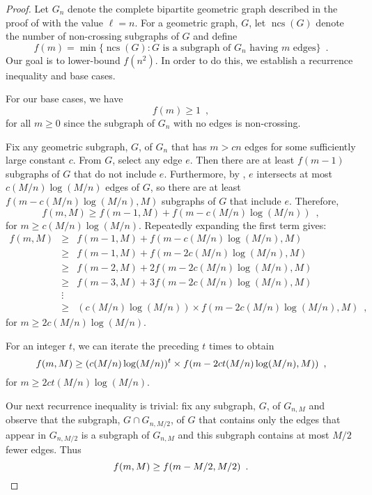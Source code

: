 \documentclass{patmorin}
\DeclareMathOperator{\ncs}{ncs}
\begin{document}
\begin{proof}
Let $G_n$ denote the complete bipartite geometric graph described in
the proof of  with the value $\ell=n$.  For a
geometric graph, $G$, let $\ncs(G)$ denote the number of non-crossing
subgraphs of $G$ and define
\[
   f(m) = \min\{ \ncs(G) : \mbox{$G$ is a subgraph of $G_{n}$ having $m$ edges} \}
   \enspace . 
\]
Our goal is to lower-bound $f(n^2)$.  In order to do this, we establish
a recurrence inequality and base cases.

For our base cases, we have 
\[ 
   f(m)\ge 1 \enspace ,
\]
for all $m\ge 0$ since the subgraph of $G_{n}$ with no edges is
non-crossing.

Fix any geometric subgraph, $G$, of $G_{n}$ that has $m> cn$
edges for some sufficiently large constant $c$.  From $G$, select any edge $e$. Then there are at least
$f(m-1)$ subgraphs of $G$ that do not include $e$.  Furthermore, by
, $e$ intersects at most $c(M/n)\log(M/n)$
edges of $G$, so there are at least $f(m-c(M/n)\log(M/n),M)$ subgraphs
of $G$ that include $e$.  Therefore,
\[  f(m,M) \ge f(m-1,M) + f(m-c(M/n)\log(M/n)) \enspace ,
\]
for $m\ge c(M/n)\log(M/n)$.  Repeatedly expanding the first term gives:
\begin{eqnarray*}
f(m,M) & \ge & f(m-1,M) + f(m-c(M/n)\log(M/n), M) \\
       & \ge & f(m-1,M) + f(m-2c(M/n)\log(M/n), M) \\
       & \ge & f(m-2,M) + 2f(m-2c(M/n)\log(M/n), M) \\
       & \ge & f(m-3,M) + 3f(m-2c(M/n)\log(M/n), M) \\
       & \vdots & \\
       & \ge & (c(M/n)\log(M/n))\times f(m-2c(M/n)\log(M/n), M) \enspace ,
\end{eqnarray*}
for $m\ge 2c(M/n)\log(M/n)$.

For an integer $t$, we can iterate the preceding $t$ times to obtain
\begin{equation}
   f(m,M) \ge (c(M/n)\log(M/n))^t\times f(m-2ct(M/n)\log(M/n), M)) \enspace ,
   \eqlabel{recur-a}
\end{equation} 
for $m\ge 2ct(M/n)\log(M/n)$.

Our next recurrence inequality is trivial: fix any subgraph, $G$,
of $G_{n,M}$ and observe that the subgraph, $G\cap G_{n,M/2}$, of $G$
that contains only the edges that appear in $G_{n,M/2}$ is a subgraph
of $G_{n,M}$ and this subgraph contains at most $M/2$ fewer edges.  Thus
\begin{equation}
  f(m,M) \ge f(m-M/2,M/2) \enspace .
  \eqlabel{recur-b}
\end{equation}


\end{proof}
\end{document}
